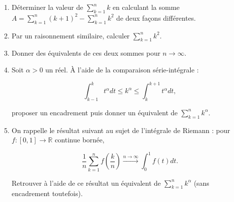 
\medskip

\begin{mdframed}
\begin{exercice}
\begin{enumerate}
\item Déterminer la valeur de $\sum_{k=1}^n k$ en calculant la somme $A = \sum_{k=1}^n (k + 1)^2 - \sum_{k=1}^n k^2$ de deux façons différentes.
\item Par un raisonnement similaire, calculer $\sum_{k=1}^n k^2$.
\item Donner des équivalents de ces deux sommes pour $n \to \infty$.
\item Soit $\alpha > 0$ un réel. À l'aide de la comparaison série-intégrale :

$$
\int_{k-1}^k t^\alpha dt \le k^\alpha \le \int_k^{k+1} t^\alpha dt,
$$

proposer un encadrement puis donner un équivalent de $\sum_{k=1}^n k^\alpha$.
\item On rappelle le résultat suivant au sujet de l'intégrale de Riemann : pour $f : [0, 1] \to \mathbb{R}$ continue bornée,

$$
\frac{1}{n} \sum_{k=1}^n f\left(\frac{k}{n}\right) \xrightarrow{n \to \infty} \int_0^1 f(t) dt.
$$

Retrouver à l'aide de ce résultat un équivalent de $\sum_{k=1}^n k^\alpha$ (sans encadrement toutefois).
\end{enumerate}
\end{exercice}
\end{mdframed}


